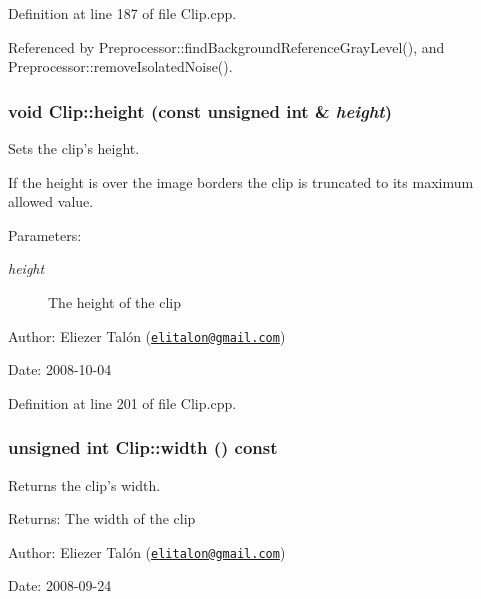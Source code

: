 Definition at line 187 of file Clip.cpp.

Referenced by Preprocessor::findBackgroundReferenceGrayLevel(), and Preprocessor::removeIsolatedNoise().\hypertarget{class_clip_f5b4598afd42e098c3811f7a82227cdd}{
\subsubsection[height]{\setlength{\rightskip}{0pt plus 5cm}void Clip::height (const unsigned int \& {\em height})}}
\label{class_clip_f5b4598afd42e098c3811f7a82227cdd}


Sets the clip's height. 

If the height is over the image borders the clip is truncated to its maximum allowed value.

\begin{Desc}
\item[Parameters:]
\begin{description}
\item[{\em height}]The height of the clip\end{description}
\end{Desc}
\begin{Desc}
\item[Author:]Eliezer Talón (\href{mailto:elitalon@gmail.com}{\tt elitalon@gmail.com}) \end{Desc}
\begin{Desc}
\item[Date:]2008-10-04 \end{Desc}


Definition at line 201 of file Clip.cpp.\hypertarget{class_clip_d3e816599913e4051e5d50fae17ecd76}{
\subsubsection[width]{\setlength{\rightskip}{0pt plus 5cm}unsigned int Clip::width () const}}
\label{class_clip_d3e816599913e4051e5d50fae17ecd76}


Returns the clip's width. 

\begin{Desc}
\item[Returns:]The width of the clip\end{Desc}
\begin{Desc}
\item[Author:]Eliezer Talón (\href{mailto:elitalon@gmail.com}{\tt elitalon@gmail.com}) \end{Desc}
\begin{Desc}
\item[Date:]2008-09-24 \end{Desc}


